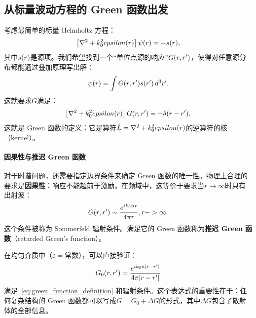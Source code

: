 \subsection{从标量波动方程的 Green 函数出发}
考虑最简单的标量 Helmholtz 方程：
\begin{equation}
\left[\nabla^2 + k_0^2epsilon(r)\right]\psi(r) = -s(r),
\label{eq:scalar_helmholtz_source}
\end{equation}
其中$s(r)$是源项。我们希望找到一个“单位点源的响应”$G(r,r')$，使得对任意源分布都能通过叠加原理写出解：
\begin{equation}
\psi(r) = \int G(r,r') s(r')\,d^3 r'.
\label{eq:green_solution_integral}
\end{equation}
这就要求$G$满足：
\begin{equation}
\left[\nabla^2 + k_0^2epsilon(r)\right]G(r,r') = -\delta(r-r').
\label{eq:green_function_definition}
\end{equation}
这就是 Green 函数的定义：它是算符$\hat{L}=\nabla^2+k_0^2epsilon(r)$的逆算符的核（kernel）。

\paragraph{因果性与推迟 Green 函数} 对于时谐问题，还需要指定边界条件来确定 Green 函数的唯一性。物理上合理的要求是\textbf{因果性}：响应不能超前于激励。在频域中，这等价于要求当$r\to\infty$时只有出射波：
\begin{equation}
G(r,r') \sim \frac{e^{i k_0 n r}}{4\pi r},  r->\infty.
\label{eq:sommerfeld_radiation_condition}
\end{equation}
这个条件被称为 Sommerfeld 辐射条件。满足它的 Green 函数称为\textbf{推迟 Green 函数}（retarded Green's function）。

\begin{ExampleBox}
在均匀介质中（$\varepsilon=$常数），可以直接验证：
\begin{equation}
G_0(r,r') = \frac{e^{i k_0 n |r-r'|}}{4\pi|r-r'|}
\end{equation}
满足~\cref{eq:green_function_definition} 和辐射条件。这个表达式的重要性在于：任何复杂结构的 Green 函数都可以写成$G=G_0+\Delta G$的形式，其中$\Delta G$包含了散射体的全部信息。
\end{ExampleBox}

